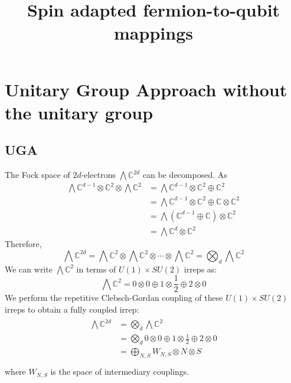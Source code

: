 \documentclass{article}
\title{Spin adapted fermion-to-qubit mappings}
\begin{document}
\section{Unitary Group Approach without the unitary group}
\subsection{UGA}
The Fock space of $2d$-electrons $\bigwedge\mathbb{C}^{2d}$ can be decomposed. As 
\begin{align}
    \bigwedge \mathbb{C}^{d-1}\otimes \mathbb{C}^2 \otimes \bigwedge \mathbb{C}^2 &= \bigwedge \mathbb{C}^{d-1}\otimes \mathbb{C}^2 \oplus \mathbb{C}^2 \\
    &= \bigwedge \mathbb{C}^{d-1}\otimes \mathbb{C}^2 \oplus \mathbb{C}\otimes\mathbb{C}^2\\
    &= \bigwedge (\mathbb{C}^{d-1}\oplus \mathbb{C})\otimes \mathbb{C}^2 \\
    &= \bigwedge \mathbb{C}^{d}\otimes \mathbb{C}^2
\end{align}
Therefore,
\begin{equation}
    \bigwedge\mathbb{C}^{2d}= \bigwedge\mathbb{C}^2 \otimes \bigwedge\mathbb{C}^2 \otimes \cdots \otimes \bigwedge\mathbb{C}^2 = \bigotimes_{d} \bigwedge\mathbb{C}^2
\end{equation}
We can write $\bigwedge \mathbb{C}^2$ in terms of $U(1) \times SU(2)$ irreps as:
\begin{equation}
    \bigwedge \mathbb{C}^2 = 0\otimes 0 \oplus 1 \otimes \frac{1}{2} \oplus 2 \otimes 0
\end{equation}
We perform the repetitive Clebsch-Gordan coupling of these $U(1) \times SU(2)$ irreps to obtain a fully coupled irrep:
\begin{align}
\begin{split}
\label{eq:coupling}
    \bigwedge\mathbb{C}^{2d} &= \bigotimes_{d} \bigwedge\mathbb{C}^2 \\
                            &= \bigotimes_{d} 0\otimes 0 \oplus 1 \otimes \frac{1}{2} \oplus 2 \otimes 0 \\
                            &= \bigoplus_{N,S} W_{N,S}\otimes N\otimes S \\
                            \end{split}
\end{align}
where $W_{N,S}$ is the space of intermediary couplings. 
\end{document}

